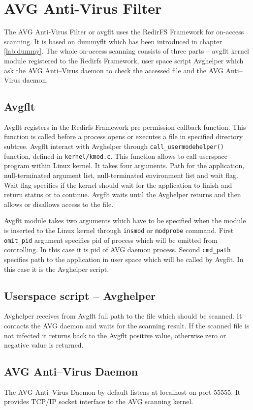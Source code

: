 \chapter{AVG Anti-Virus Filter}
The AVG Anti-Virus Filter or avgflt uses the RedirFS Framework for on-access scanning. It is
based on dummyflt which has been introduced in chapter \ref{lab:dummy}. The whole
on-access scanning consists of three parts -- avgflt kernel module registered to the
Redirfs Framework, user space script Avghelper which ask the AVG Anti--Virus daemon to
check the accessed file and the AVG Anti--Virus daemon.

\section{Avgflt}
Avgflt registers in the Redirfs Framework pre permission callback function. This function is
called before a process opens or executes a file in specified directory subtree. Avgflt
interact with Avghelper through \texttt{call\_usermodehelper()} function, defined in
\texttt{kernel/kmod.c}. This function allows to call userspace program within Linux
kernel. It takes four arguments. Path for the application, null-terminated argument
list, null-terminated environment list and wait flag. Wait flag specifies if the
kernel should wait for the application to finish and return status or to continue.
Avgflt waits until the Avghelper returns and then allows or disallows access to the
file.

Avgflt module takes two arguments which have to be specified when the module is
inserted to the Linux kernel through \texttt{insmod} or \texttt{modprobe} command.
First \texttt{omit\_pid} argument specifies pid of process which will be omitted from
controlling. In this case it is pid of AVG daemon process. Second \texttt{cmd\_path}
specifies path to the application in user space which will be called by Avgflt. In this
case it is the Avghelper script.

\section{Userspace script -- Avghelper}
Avghelper receives from Avgflt full path to the file which should be scanned. It
contacts the AVG daemon and waits for the scanning result. If the scanned file is not infected
it returns back to the Avgflt positive value, otherwise zero or negative value is
returned.

\section{AVG Anti--Virus Daemon}
The AVG Anti--Virus Daemon by default listens at localhost on port 55555. It provides
TCP/IP socket interface to the AVG scanning kernel.
